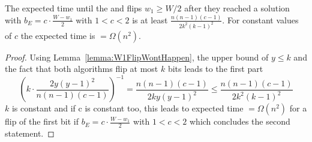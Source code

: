 \begin{corollary}\label{corollary:W1FlipWontHappen}
    The expected time until the \RLSR[k] and \RLSN[k] flips $w_1\ge W/2$ after they reached a solution with $b_E = c\cdot\frac{W-w_1}{2}$ with $1<c<2$ is at least \(\frac{n(n-1)(c-1)}{2k^2{(k-1)}^2}\). For constant values of $c$ the expected time is $=\Omega(n^2)$.
\end{corollary}
\begin{proof}
    Using Lemma~\ref{lemma:W1FlipWontHappen}, the upper bound of $y\le k$ and the fact that both algorithms flip at most $k$ bits leads to the first part
    \[ {(k\cdot\frac{2y{(y-1)}^2}{n(n-1)(c-1)})}^{-1}=\frac{n(n-1)(c-1)}{2ky{(y-1)}^2} \le\frac{n(n-1)(c-1)}{2k^2{(k-1)}^2}\]
    $k$ is constant and if c is constant too, this leads to expected time $=\Omega(n^2)$ for a flip of the first bit if $b_E = c\cdot\frac{W-w_1}{2}$ with $1<c<2$ which concludes the second statement.
\end{proof}

